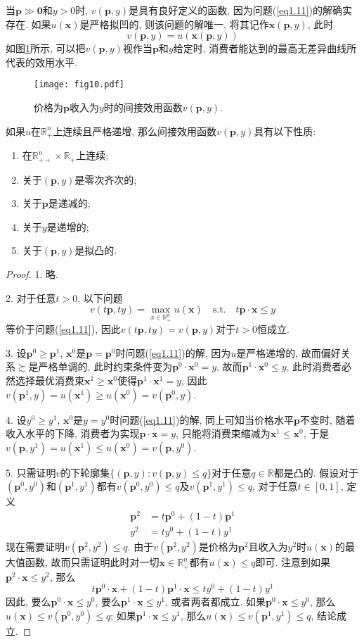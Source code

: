 \documentclass[cn, 12pt, math=mtpro2, bibstyle=apa, blue, twocol]{elegantbook}
\newcommand{\R}{\mathbb{R}}
\newcommand{\p}{\mathbf{p}}
\newcommand{\x}{\mathbf{x}}
\begin{document}
当$\p\gg\mathbf{0}$和$y>0$时, $v(\p,y)$是具有良好定义的函数, 因为问题(\ref{eq1.11})的解确实存在. 如果$u(\x)$是严格拟凹的, 则该问题的解唯一, 将其记作$\x(\p,y)$, 此时
$$v(\p,y)=u(\x(\p,y))$$
如图\ref{fig1.10}所示, 可以把$v(\p,y)$视作当$\p$和$y$给定时, 消费者能达到的最高无差异曲线所代表的效用水平.
\begin{figure}[htbp!]
  \centering
  \texttt{[image: fig10.pdf]}
  \caption{价格为$\p$收入为$y$时的间接效用函数$v(\p,y)$.}\label{fig1.10}
\end{figure}
\begin{theorem}[间接效用函数的性质]
  如果$u$在$\R_+^n$上连续且严格递增, 那么间接效用函数$v(\p,y)$具有以下性质:
  \begin{enumerate}[label=\arabic*.]
    \item 在$\R_{++}^n\times\R_+$上连续;
    \item 关于$(\p,y)$是零次齐次的;
    \item 关于$\p$是递减的;
    \item 关于$y$是递增的;
    \item 关于$(\p,y)$是拟凸的.
  \end{enumerate}
\end{theorem}
\begin{proof}
  1. 略.

  2. 对于任意$t>0$, 以下问题
  $$v(t\p,ty)=\max_{x\in\R_+^n}u(\x)\quad\text{s.t.}\quad t\p\cdot\x\leq y$$
  等价于问题(\ref{eq1.11}), 因此$v(t\p,ty)=v(\p,y)$对于$t>0$恒成立.

  3. 设$\p^0\ge\p^1$, $\x^0$是$\p=\p^0$时问题(\ref{eq1.11})的解, 因为$u$是严格递增的, 故而偏好关系$\succsim$是严格单调的, 此时约束条件变为$\p^0\cdot\x^0=y$, 故而$\p^1\cdot\x^0\leq y$, 此时消费者必然选择最优消费束$\x^1\ge \x^0$使得$\p^1\cdot\x^1=y$, 因此$v(\p^1,y)=u(\x^1)\geq u(\x^0)=v(\p^0,y)$.

  4. 设$y^0\ge y^1$, $\x^0$是$y=y^0$时问题(\ref{eq1.11})的解, 同上可知当价格水平$\p$不变时, 随着收入水平的下降, 消费者为实现$\p\cdot\x=y$, 只能将消费束缩减为$\x^1\leq \x^0$, 于是$v(\p,y^1)=u(\x^1)\leq u(\x^0)=v(\p,y^0)$.

  5. 只需证明$v$的下轮廓集$\{(\p,y):v(\p,y)\leq q\}$对于任意$q\in\R$都是凸的. 假设对于$(\p^0,y^0)$和$(\p^1,y^1)$都有$v(\p^0,y^0)\leq q$及$v(\p^1,y^1)\leq q$, 对于任意$t\in[0,1]$, 定义
  \begin{align*}
  \p^2&=t\p^0+(1-t)\p^1 \\
  y^2&=ty^0+(1-t)y^1
  \end{align*}
  现在需要证明$v(\p^2,y^2)\leq q$. 由于$v(\p^2,y^2)$是价格为$\p^2$且收入为$y^2$时$u(\x)$的最大值函数, 故而只需证明此时对一切$\x\in\R_+^n$都有$u(\x)\leq q$即可. 注意到如果$\p^2\cdot\x\leq y^2$, 那么
  $$t\p^0\cdot\x+(1-t)\p^1\cdot\x\leq ty^0+(1-t)y^1$$
  因此, 要么$\p^0\cdot \x\leq y^0$, 要么$\p^1\cdot\x\leq y^1$, 或者两者都成立. 如果$\p^0\cdot \x\leq y^0$, 那么$u(\x)\leq v(\p^0,y^0)\leq q$; 如果$\p^1\cdot\x\leq y^1$, 那么$u(\x)\leq v(\p^1,y^1)\leq q$, 结论成立.

\end{proof}
\end{document}
